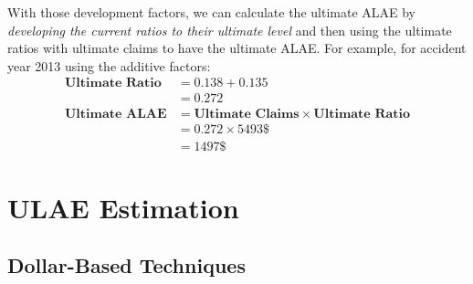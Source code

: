 \documentclass[11pt, english]{memoir}
\numberwithin{definition}{section}
\begin{document}
With those development factors, we can calculate the ultimate ALAE by \emph{developing the current ratios to their ultimate level} and then using the ultimate ratios with ultimate claims to have the ultimate ALAE. For example, for accident year 2013 using the additive factors: 
\begin{align*}
\textbf{Ultimate Ratio} &= 0.138 + 0.135 \\&= 0.272\\[7pt]
\textbf{Ultimate ALAE} &= \textbf{Ultimate Claims}\times\textbf{Ultimate Ratio}\\
&= 0.272 \times 5493\$\\
&= 1497\$
\end{align*}
	
	
	
	
	
	
	

\chapter{ULAE Estimation}


\section{Dollar-Based Techniques}
\end{document}
